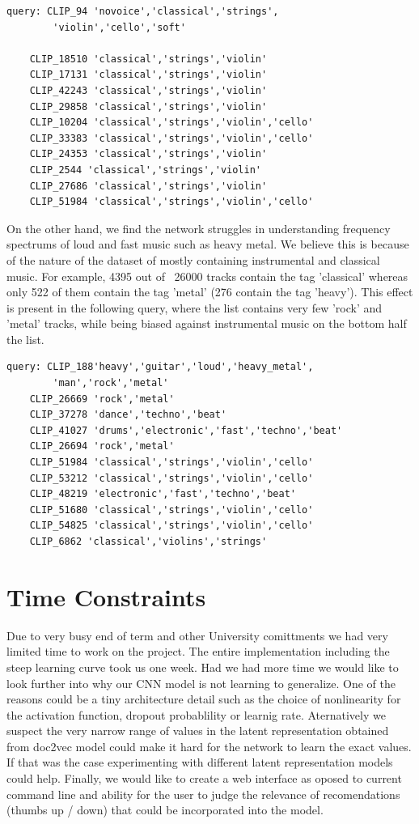 \documentclass[11pt, a4paper]{article}
\begin{document}
    \begin{Verbatim}[xleftmargin=.5in]
    query: CLIP_94 'novoice','classical','strings',
        'violin','cello','soft'

    CLIP_18510 'classical','strings','violin'
    CLIP_17131 'classical','strings','violin'
    CLIP_42243 'classical','strings','violin'
    CLIP_29858 'classical','strings','violin'
    CLIP_10204 'classical','strings','violin','cello'
    CLIP_33383 'classical','strings','violin','cello'
    CLIP_24353 'classical','strings','violin'
    CLIP_2544 'classical','strings','violin'
    CLIP_27686 'classical','strings','violin'
    CLIP_51984 'classical','strings','violin','cello'
    \end{Verbatim}

    \noindent
    On the other hand, we find the network struggles in understanding frequency
    spectrums of loud and fast music such as heavy metal. We believe this is
    because of the nature of the dataset of mostly containing instrumental and
    classical music. For example, 4395 out of ~26000 tracks contain the tag
    'classical' whereas only 522 of them contain the tag 'metal' (276 contain the
    tag 'heavy'). This effect is present in the following query, where the list
    contains very few 'rock' and 'metal' tracks, while being biased against
    instrumental music on the bottom half the list.

    \begin{Verbatim}[xleftmargin=.5in]
    query: CLIP_188'heavy','guitar','loud','heavy_metal',
        'man','rock','metal'
    CLIP_26669 'rock','metal'
    CLIP_37278 'dance','techno','beat'
    CLIP_41027 'drums','electronic','fast','techno','beat'
    CLIP_26694 'rock','metal'
    CLIP_51984 'classical','strings','violin','cello'
    CLIP_53212 'classical','strings','violin','cello'
    CLIP_48219 'electronic','fast','techno','beat'
    CLIP_51680 'classical','strings','violin','cello'
    CLIP_54825 'classical','strings','violin','cello'
    CLIP_6862 'classical','violins','strings'
    \end{Verbatim}

  \section{Time Constraints}
    Due to very busy end of term and other University comittments we had very
    limited time to work on the project. The entire implementation including
    the steep learning curve took us one week. Had we had more time we would
    like to look further into why our CNN model is not learning to generalize.
    One of the reasons could be a tiny architecture detail such as the choice
    of nonlinearity for the activation function, dropout probablility or
    learnig rate. Aternatively we suspect the very narrow range of values in
    the latent representation obtained from doc2vec model could make it hard
    for the network to learn the exact values. If that was the case
    experimenting with different latent representation models could help.
    Finally, we would like to create a web interface as oposed to current
    command line and ability for the user to judge the relevance of
    recomendations (thumbs up / down) that could be incorporated into the
    model.
    
\end{document}
